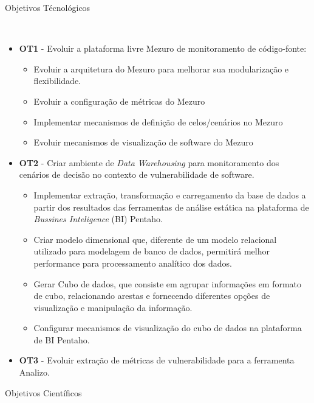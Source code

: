 %
\begin{description}
	\item [Objetivos Técnológicos]\
\end{description}
		\begin{itemize}
			\item \textbf{OT1} - Evoluir a plataforma livre Mezuro de monitoramento de código-fonte:
				\begin{itemize}
					\item Evoluir a arquitetura do Mezuro para melhorar sua modularização e flexibilidade.
					\item Evoluir a configuração de métricas do Mezuro
					\item Implementar mecanismos de definição de celos/cenários no Mezuro
					\item Evoluir mecanismos de visualização de software do Mezuro
				\end{itemize}

			\item \textbf{OT2} - Criar ambiente de \emph{Data Warehousing} para monitoramento dos cenários de decisão no contexto de vulnerabilidade de software.	
	        	\begin{itemize}
	        		\item Implementar extração, transformação e carregamento da base de dados a partir dos resultados das ferramentas de análise estática na plataforma de \emph{Bussines Inteligence} (BI) Pentaho.
	        		\item Criar modelo dimensional que, diferente de um modelo relacional utilizado para modelagem de banco de dados, permitirá melhor performance para processamento analítico dos dados.
	        		\item Gerar Cubo de dados, que consiste em agrupar informações em formato de cubo, relacionando arestas e fornecendo diferentes opções de visualização e manipulação da informação.
					\item Configurar mecanismos de visualização do cubo de dados na plataforma de BI Pentaho.
	        	\end{itemize}
			\item \textbf{OT3} - Evoluir extração de métricas de vulnerabilidade para a ferramenta Analizo.
		\end{itemize}
\begin{description}
	\item [Objetivos Científicos]\
\end{description}	
